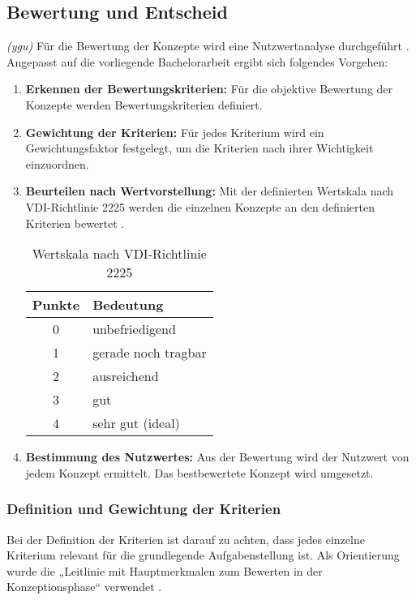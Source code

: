 \newpage
\subsection{Bewertung und Entscheid}
\textit{(ygu)} Für die Bewertung der Konzepte wird eine Nutzwertanalyse durchgeführt \cite{naefe}. Angepasst auf die vorliegende Bachelorarbeit ergibt sich folgendes Vorgehen:

\begin{enumerate}
	\item \textbf{Erkennen der Bewertungskriterien:} Für die objektive Bewertung der Konzepte werden Bewertungskriterien definiert.
	
	\item \textbf{Gewichtung der Kriterien:} Für jedes Kriterium wird ein Gewichtungsfaktor festgelegt, um die Kriterien nach ihrer Wichtigkeit einzuordnen.
	
	\item \textbf{Beurteilen nach Wertvorstellung:} Mit der definierten Wertskala nach VDI-Richtlinie 2225 werden die einzelnen Konzepte an den definierten Kriterien bewertet \cite{vdi2225}.

\begin{table}[H]
	\begin{tabular}{|c|l|}
		\hline 
		\textbf{Punkte} & \textbf{Bedeutung} \\ 
		\hline 
		0 & unbefriedigend \\ 
		\hline 
		1 & gerade noch tragbar \\ 
		\hline 
		2 & ausreichend \\ 
		\hline 
		3 & gut \\ 
		\hline 
		4 & sehr gut (ideal) \\ 
		\hline 
	\end{tabular} 
	\caption{Wertskala nach VDI-Richtlinie 2225}
	\label{tab:wertskala}
\end{table}	
	
	
	\item \textbf{Bestimmung des Nutzwertes:} Aus der Bewertung wird der Nutzwert von jedem Konzept ermittelt. Das bestbewertete Konzept wird umgesetzt.
\end{enumerate}
\newpage
\subsubsection{Definition und Gewichtung der Kriterien}
Bei der Definition der Kriterien ist darauf zu achten, dass jedes einzelne Kriterium relevant für die grundlegende Aufgabenstellung ist.
Als Orientierung wurde die „Leitlinie mit Hauptmerkmalen zum Bewerten in der Konzeptionsphase“ verwendet \cite{pahl}. 
\newline

